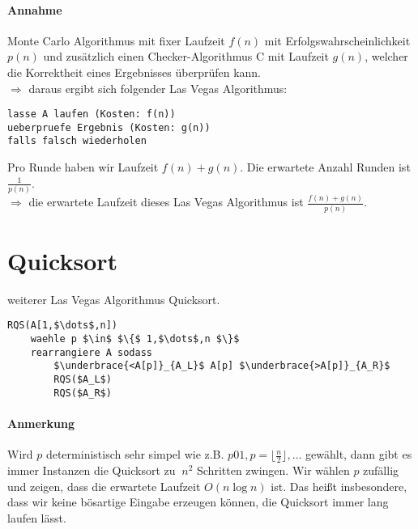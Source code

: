\paragraph*{Annahme} Monte Carlo Algorithmus mit fixer Laufzeit $f(n)$ mit Erfolgswahrscheinlichkeit $p(n)$ und zusätzlich einen Checker-Algorithmus C mit Laufzeit $g(n)$, welcher die Korrektheit eines Ergebnisses überprüfen kann. \\
$\Rightarrow$ daraus ergibt sich folgender Las Vegas Algorithmus:
\begin{lstlisting}
lasse A laufen (Kosten: f(n))
ueberpruefe Ergebnis (Kosten: g(n))
falls falsch wiederholen
\end{lstlisting}

Pro Runde haben wir Laufzeit $f(n)+g(n)$. Die erwartete Anzahl Runden ist $\frac{1}{p(n)}$. \\
$\Rightarrow$ die erwartete Laufzeit dieses Las Vegas Algorithmus ist $\frac{f(n)+g(n)}{p(n)}$.

\section{Quicksort}
weiterer Las Vegas Algorithmus Quicksort.
\begin{lstlisting}[mathescape]
RQS(A[1,$\dots$,n])
	waehle p $\in$ $\{$ 1,$\dots$,n $\}$
	rearrangiere A sodass
		$\underbrace{<A[p]}_{A_L}$ A[p] $\underbrace{>A[p]}_{A_R}$
		RQS($A_L$)
		RQS($A_R$)
\end{lstlisting}

\paragraph*{Anmerkung} Wird $p$ deterministisch sehr simpel wie z.B. $p01,p=\lfloor\frac{n}{2}\rfloor,\dots$ gewählt, dann gibt es immer Instanzen die Quicksort zu $~n^2$ Schritten zwingen.
Wir wählen $p$ zufällig und zeigen, dass die erwartete Laufzeit $O(n \log n)$ ist. Das heißt insbesondere, dass wir keine bösartige Eingabe erzeugen können, die Quicksort immer lang laufen lässt.